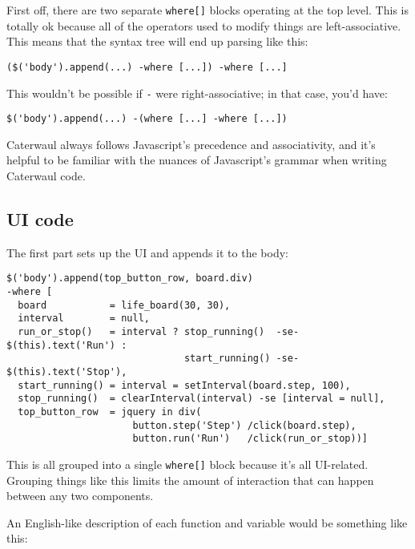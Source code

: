 \documentclass{report}
\begin{document}
    First off, there are two separate {\tt where[]} blocks operating at the top level. This is totally ok because all of the operators used to modify things are left-associative. This means
    that the syntax tree will end up parsing like this:

\begin{verbatim}
($('body').append(...) -where [...]) -where [...]
\end{verbatim}

    This wouldn't be possible if {\tt -} were right-associative; in that case, you'd have:

\begin{verbatim}
$('body').append(...) -(where [...] -where [...])
\end{verbatim}

    Caterwaul always follows Javascript's precedence and associativity, and it's helpful to be familiar with the nuances of Javascript's grammar when writing Caterwaul code.

\subsection{UI code}
      The first part sets up the UI and appends it to the body:

\begin{verbatim}
$('body').append(top_button_row, board.div)
-where [
  board           = life_board(30, 30),
  interval        = null,
  run_or_stop()   = interval ? stop_running()  -se- $(this).text('Run') :
                               start_running() -se- $(this).text('Stop'),
  start_running() = interval = setInterval(board.step, 100),
  stop_running()  = clearInterval(interval) -se [interval = null],
  top_button_row  = jquery in div(
                      button.step('Step') /click(board.step),
                      button.run('Run')   /click(run_or_stop))]
\end{verbatim}

      This is all grouped into a single {\tt where[]} block because it's all UI-related. Grouping things like this limits the amount of interaction that can happen between any two components.

      An English-like description of each function and variable would be something like this:
\end{document}
